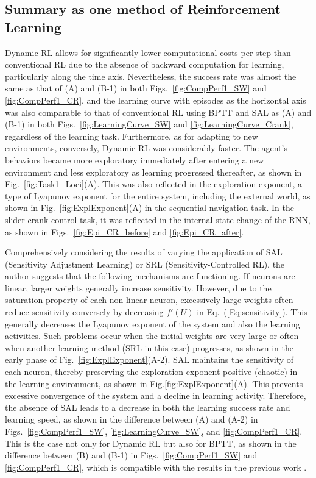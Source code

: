 \subsection{Summary as one method of Reinforcement Learning}
Dynamic RL allows for significantly lower computational costs per step than conventional RL
due to the absence of backward computation for learning, particularly along the time axis.
Nevertheless, the success rate was almost the same as that of (A) and (B-1)
in both Figs.~\ref{fig:CompPerf1_SW} and \ref{fig:CompPerf1_CR},
and the learning curve with episodes as the horizontal axis was also comparable to that of conventional RL
using BPTT and SAL as (A) and (B-1)
in both Figs.~\ref{fig:LearningCurve_SW} and \ref{fig:LearningCurve_Crank}, regardless of the learning task.
Furthermore, as for adapting to new environments, conversely, Dynamic RL was considerably faster.
The agent's behaviors became more exploratory immediately after entering a new environment
and less exploratory as learning progressed thereafter, as shown in Fig.~\ref{fig:Task1_Loci}(A).
This was also reflected in the exploration exponent,
a type of Lyapunov exponent for the entire system, including the external world,
as shown in Fig.~\ref{fig:ExplExponent}(A) in the sequential navigation task.
In the slider-crank control task, it was reflected in the internal state change of the RNN,
as shown in Figs.~\ref{fig:Epi_CR_before} and \ref{fig:Epi_CR_after}.

Comprehensively considering the results of varying the application of
SAL (Sensitivity Adjustment Learning) or SRL (Sensitivity-Controlled RL),
the author suggests that the following mechanisms are functioning.
If neurons are linear, larger weights generally increase sensitivity.
However, due to the saturation property of each non-linear neuron,
excessively large weights often reduce sensitivity conversely
by decreasing $f'(U)$ in Eq.~(\ref{Eq:sensitivity}).
This generally decreases the Lyapunov exponent of the system and also the learning activities.
Such problems occur when the initial weights are very large
or often when another learning method (SRL in this case) progresses,
as shown in the early phase of Fig.~\ref{fig:ExplExponent}(A-2).
SAL maintains the sensitivity of each neuron,
thereby preserving the exploration exponent positive (chaotic) in the learning environment,
as shown in Fig.\ref{fig:ExplExponent}(A).
This prevents excessive convergence of the system and a decline in learning activity.
Therefore, the absence of SAL leads to a decrease in both the learning success rate and learning speed, as shown in
the difference between (A) and (A-2) in Figs.~\ref{fig:CompPerf1_SW}, \ref{fig:LearningCurve_SW}, 
and \ref{fig:CompPerf1_CR}.
This is the case not only for Dynamic RL but also for BPTT, as shown in the difference between (B) and (B-1)
in Figs.~\ref{fig:CompPerf1_SW} and \ref{fig:CompPerf1_CR},
which is compatible with the results in the previous work \citep{Sensitivity}.

